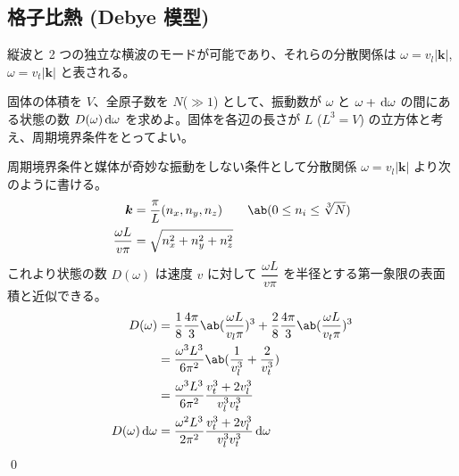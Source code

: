 \documentclass[uplatex,dvipdfmx,a4paper,11pt]{jlreq}
\makeatletter
\newcommand{\kk}{\bm{k}}
\numberwithin{equation}{section}
\theoremstyle{definition}
\renewenvironment{proof}[1][\proofname]{\par
  \normalfont
  \topsep6\p@\@plus6\p@ \trivlist
  \item[\hskip\labelsep{\bfseries #1}\@addpunct{\bfseries}]\ignorespaces\quad\par
}{%
  \qed\endtrivlist\@endpefalse
}
\renewcommand\proofname{証明}
\makeatother
\begin{document}
\subsection{格子比熱 (Debye 模型)}
縦波と 2 つの独立な横波のモードが可能であり、それらの分散関係は $\omega = v_l|\kk|$, $\omega = v_t|\kk|$ と表される。
\begin{problem}
固体の体積を $V$、全原子数を $N$($\gg 1$) として、振動数が $\omega$ と $\omega + \dl{\omega}$ の間にある状態の数 $D(\omega)\dl{\omega}$ を求めよ。固体を各辺の長さが $L$ ($L^3 = V$) の立方体と考え、周期境界条件をとってよい。
\end{problem}
\begin{proof}
  周期境界条件と媒体が奇妙な振動をしない条件として分散関係 $\omega = v_l|\kk|$ より次のように書ける。
  \begin{align}
    \kk                   & = \frac{\pi}{L}(n_x, n_y, n_z) \qquad \ab(0 \leq n_i \leq \sqrt[3]{N}) \\
    \frac{\omega L}{v\pi} & = \sqrt{n_x^2 + n_y^2 + n_z^2}
  \end{align}
  これより状態の数 $D(\omega)$ は速度 $v$ に対して $\dfrac{\omega L}{v\pi}$ を半径とする第一象限の表面積と近似できる。
  \begin{align}
    D(\omega)            & = \frac{1}{8}\frac{4\pi}{3}\ab(\frac{\omega L}{v_l\pi})^3 + \frac{2}{8}\frac{4\pi}{3}\ab(\frac{\omega L}{v_t\pi})^3 \\
                         & = \frac{\omega^3 L^3}{6\pi^2}\ab(\frac{1}{v_l^3} + \frac{2}{v_t^3})                                                 \\
                         & = \frac{\omega^3 L^3}{6\pi^2}\frac{v_t^3 + 2v_l^3}{v_l^3v_t^3}                                                      \\
    D(\omega)\dl{\omega} & = \frac{\omega^2 L^3}{2\pi^2}\frac{v_t^3 + 2v_l^3}{v_l^3v_t^3}\dl{\omega}                                           \\
  \end{align}
\end{proof}
\end{document}
